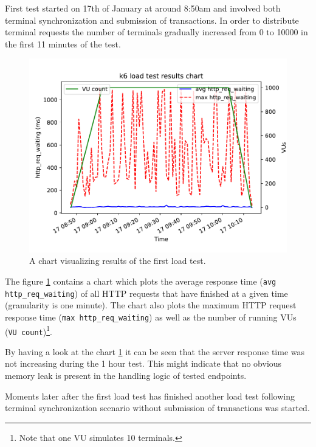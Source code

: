 \documentclass[12pt, a4paper]{article}
\begin{document}
First test started on 17th of January at around 8:50am and involved both terminal synchronization and submission of transactions.
In order to distribute terminal requests the number of terminals gradually increased from 0 to 10000 in the first 11 minutes of the test.

\begin{figure}[!ht]
    \centering 
    \includegraphics[width=1\textwidth]{pdf/avg-waiting-time-1.pdf}
    \caption{A chart visualizing results of the first load test.}
    \label{fig:waiting-time-1}
\end{figure}

The figure \ref{fig:waiting-time-1} contains a chart which plots the average response time (\texttt{avg http\_req\_waiting}) of all HTTP requests that have finished at a given time (granularity is one minute).
The chart also plots the maximum HTTP request response time (\texttt{max http\_req\_waiting}) as well as the number of running VUs (\texttt{VU count})\footnote{Note that one VU simulates 10 terminals.}.

By having a look at the chart \ref{fig:waiting-time-1} it can be seen that the server response time was not increasing during the 1 hour test.
This might indicate that no obvious memory leak is present in the handling logic of tested endpoints.

Moments later after the first load test has finished another load test following terminal synchronization scenario without submission of transactions was started.
\end{document}
